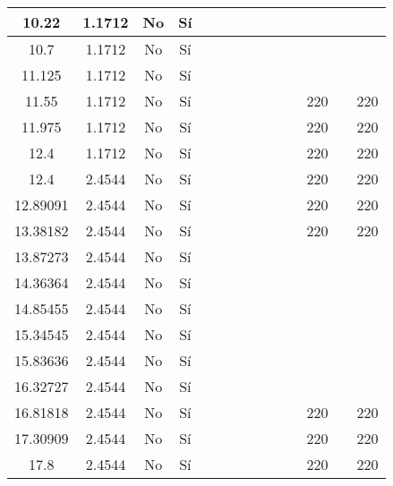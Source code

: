 \begin{table}[H]
{\begin{tabular}{|c|c|c|c|c|c|c|c|c|c|c|c|c|c|}
\hline
10.22 & 1.1712 & No  & Sí  &     &     &     &     &     &     &     &     &     &  \bigstrut\\
\hline
10.7 & 1.1712 & No  & Sí  &     &     &     &     &     &     &     &     &     &  \bigstrut\\
\hline
11.125 & 1.1712 & No  & Sí  &     &     &     &     &     &     &     &     &     &  \bigstrut\\
\hline
11.55 & 1.1712 & No  & Sí  &     &     &     &     &     &     &     & 220 &     & 220 \bigstrut\\
\hline
11.975 & 1.1712 & No  & Sí  &     &     &     &     &     &     &     & 220 &     & 220 \bigstrut\\
\hline
12.4 & 1.1712 & No  & Sí  &     &     &     &     &     &     &     & 220 &     & 220 \bigstrut\\
\hline
12.4 & 2.4544 & No  & Sí  &     &     &     &     &     &     &     & 220 &     & 220 \bigstrut\\
\hline
12.89091 & 2.4544 & No  & Sí  &     &     &     &     &     &     &     & 220 &     & 220 \bigstrut\\
\hline
13.38182 & 2.4544 & No  & Sí  &     &     &     &     &     &     &     & 220 &     & 220 \bigstrut\\
\hline
13.87273 & 2.4544 & No  & Sí  &     &     &     &     &     &     &     &     &     &  \bigstrut\\
\hline
14.36364 & 2.4544 & No  & Sí  &     &     &     &     &     &     &     &     &     &  \bigstrut\\
\hline
14.85455 & 2.4544 & No  & Sí  &     &     &     &     &     &     &     &     &     &  \bigstrut\\
\hline
15.34545 & 2.4544 & No  & Sí  &     &     &     &     &     &     &     &     &     &  \bigstrut\\
\hline
15.83636 & 2.4544 & No  & Sí  &     &     &     &     &     &     &     &     &     &  \bigstrut\\
\hline
16.32727 & 2.4544 & No  & Sí  &     &     &     &     &     &     &     &     &     &  \bigstrut\\
\hline
16.81818 & 2.4544 & No  & Sí  &     &     &     &     &     &     &     & 220 &     & 220 \bigstrut\\
\hline
17.30909 & 2.4544 & No  & Sí  &     &     &     &     &     &     &     & 220 &     & 220 \bigstrut\\
\hline
17.8 & 2.4544 & No  & Sí  &     &     &     &     &     &     &     & 220 &     & 220 \bigstrut\\

\end{tabular}}
\end{table}
